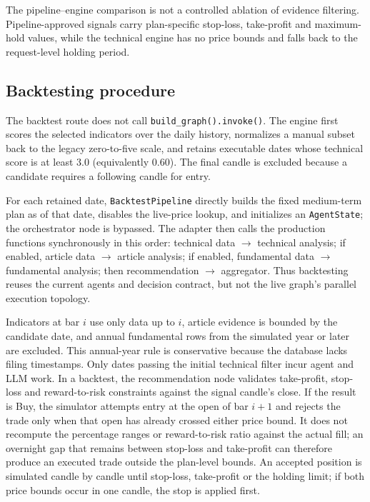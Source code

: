 \documentclass[runningheads]{llncs}
\begin{document}
The pipeline--engine comparison is not a controlled ablation of evidence filtering.
Pipeline-approved signals carry plan-specific stop-loss, take-profit and maximum-hold
values, while the technical engine has no price bounds and falls back to the
request-level holding period.

\subsection{Backtesting procedure}
The backtest route does not call \texttt{build\_graph().invoke()}. The engine first
scores the selected indicators over the daily history, normalizes a manual subset
back to the legacy zero-to-five scale, and retains executable dates whose technical
score is at least $3.0$ (equivalently $0.60$). The final candle is excluded because
a candidate requires a following candle for entry.

For each retained date, \texttt{BacktestPipeline} directly builds the fixed
medium-term plan as of that date, disables the live-price lookup, and initializes
an \texttt{AgentState}; the orchestrator node is bypassed. The adapter then calls
the production functions synchronously in this order: technical data
$\rightarrow$ technical analysis; if enabled, article data $\rightarrow$ article
analysis; if enabled, fundamental data $\rightarrow$ fundamental analysis; then
recommendation $\rightarrow$ aggregator. Thus backtesting reuses the current
agents and decision contract, but not the live graph's parallel execution
topology.

Indicators at bar $i$ use only data up to $i$, article evidence is bounded by the
candidate date, and annual fundamental rows from the simulated year or later are
excluded. This annual-year rule is conservative because the database lacks filing
timestamps. Only dates passing the initial technical filter incur agent and LLM
work. In a backtest, the recommendation node validates take-profit, stop-loss and
reward-to-risk constraints against the signal candle's close. If the result is
\textsf{Buy}, the simulator attempts entry at the open of bar $i{+}1$ and rejects
the trade only when that open has already crossed either price bound. It does not
recompute the percentage ranges or reward-to-risk ratio against the actual fill;
an overnight gap that remains between stop-loss and take-profit can therefore
produce an executed trade outside the plan-level bounds. An accepted position is
simulated candle by candle until stop-loss, take-profit or the holding limit; if
both price bounds occur in one candle, the stop is applied first.
\end{document}

